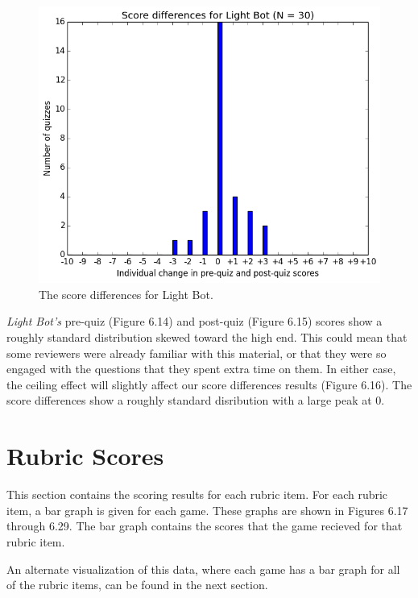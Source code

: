 			\begin{figure}[] 
			\centering 
			\includegraphics[width=\textwidth]{lightbot_results.png} 
			\caption{The score differences for Light Bot.}
			\end{figure}

			\textit{Light Bot's} pre-quiz (Figure 6.14) and post-quiz (Figure 6.15) scores show a roughly standard distribution skewed toward the high end. This could mean that some reviewers were already familiar with this material, or that they were so engaged with the questions that they spent extra time on them. In either case, the ceiling effect will slightly affect our score differences results (Figure 6.16). The score differences show a roughly standard disribution with a large peak at 0.

			\clearpage

		\section{Rubric Scores}
			This section contains the scoring results for each rubric item. For each rubric item, a bar graph is given for each game. These graphs are shown in Figures 6.17 through 6.29. The bar graph contains the scores that the game recieved for that rubric item.

			An alternate visualization of this data, where each game has a bar graph for all of the rubric items, can be found in the next section.


